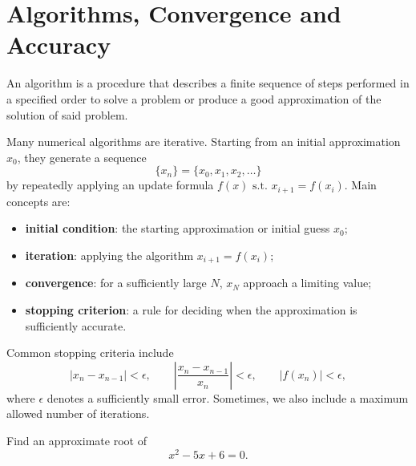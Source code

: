 \section{Algorithms, Convergence and Accuracy}

An algorithm is a procedure that describes a finite sequence of steps performed in a specified order to solve a problem or produce a good approximation of the solution of said problem.

Many numerical algorithms are iterative. Starting from an initial approximation $x_0$, they generate a sequence
\[
    \{x_n\} = \{x_0,x_1,x_2,\ldots\}
\]
by repeatedly applying an update formula $f(x) \text{ s.t. } x_{i+1} = f(x_i)$. Main concepts are:
\begin{itemize}
  \item \textbf{initial condition}: the starting approximation or initial guess $x_0$;
  \item \textbf{iteration}: applying the algorithm $x_{i+1} = f(x_i)$;
  \item \textbf{convergence}: for a sufficiently large $N$, $x_N$ approach a limiting value;
  \item \textbf{stopping criterion}: a rule for deciding when the approximation is sufficiently accurate.
\end{itemize}

\noindent
Common stopping criteria include
\[
 |x_n-x_{n-1}|<\epsilon,
 \qquad
 \left|\frac{x_n-x_{n-1}}{x_n}\right|<\epsilon,
 \qquad
 |f(x_n)|<\epsilon,
\]
where $\epsilon$ denotes a sufficiently small error.
Sometimes, we also include a maximum allowed number of iterations.

\begin{example}
Find an approximate root of
\[
 x^2-5x+6=0.
\]
\end{example}

